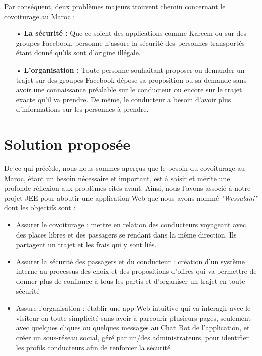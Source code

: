 \documentclass[a4paper]{report}
\begin{document}
\begin{spacing}{2}
\par 
Par conséquent, deux problèmes majeurs trouvent chemin concernant le covoiturage au Maroc :
\begin{itemize}
\item[•] \textbf{La sécurité :} Que ce soient des applications comme Kareem ou sur des groupes Facebook, personne n'assure la sécurité des personnes transportés étant donné qu'ils sont d'origine illégale. 
\item[•] \textbf{L'organisation :} Toute personne souhaitant proposer ou demander un trajet sur des groupes Facebook dépose sa proposition ou sa demande sans avoir une connaissance préalable sur le conducteur ou encore sur le trajet exacte qu'il va prendre. De même, le conducteur a besoin d'avoir plus d'informations sur les personnes à prendre.                 
\end{itemize}
\cleardoublepage
\section{Solution proposée}

De ce qui précède, nous nous sommes aperçus que le besoin du covoiturage au Maroc, étant un besoin nécessaire et important, est à saisir et mérite une profonde réflexion aux problèmes cités avant. Ainsi, nous l'avons associé à notre projet JEE pour aboutir une application Web que nous avons nommé \textit{"Wessalani"} dont les objectifs sont :


\begin{itemize}
\item Assurer le covoiturage : mettre en relation des conducteurs voyageant avec des places libres et des passagers se rendant dans la même direction. Ils partagent un trajet et les frais qui y sont liés.
\item Assurer la sécurité des passagers et du conducteur : création d'un système interne au processus des choix et des propositions d'offres qui va permettre de donner plus de confiance à tous les partis et d'organiser un trajet en toute sécurité 
\item Assure l'organisation : établir une app Web intuitive qui va interagir avec le visiteur en toute simplicité sans avoir à parcourir plusieurs pages, seulement avec quelques cliques ou quelques messages au Chat Bot de l'application, et créer un sous-réseau social, géré par un/des administrateurs,
pour identifier les profils conducteurs afin de renforcer la sécurité 
\end{itemize}



\end{spacing}
\end{document}
